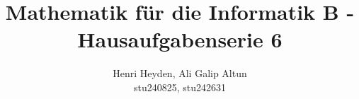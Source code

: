 \documentclass[12pt, a4paper]{article}
\title{Mathematik für die Informatik B - Hausaufgabenserie 6}
\author{Henri Heyden, Ali Galip Altun \\ \small stu240825, stu242631}
\date{}
\begin{document}
\maketitle

\doublespacing
\end{document}
